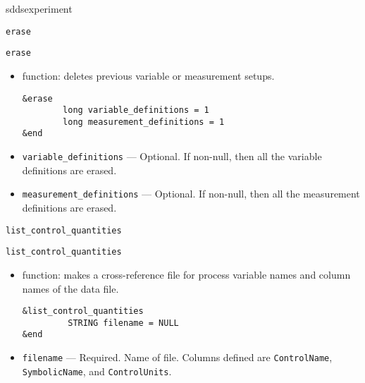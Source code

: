 \begin{sddsprog}{sddsexperiment}
\begin{itemize}
\begin{latexonly}
\newpage\begin{center}{\Large \verb+erase+}\end{center}
\end{latexonly}
\begin{htmlonly}
  \item {\Large \verb+erase+}
\end{htmlonly}
  \begin{itemize}
    \item function: deletes previous variable or measurement setups.
\begin{verbatim}
&erase
        long variable_definitions = 1
        long measurement_definitions = 1
&end
\end{verbatim}
    \item {\verb+variable_definitions+} --- Optional. If non-null, then all the variable definitions are erased.
    \item {\verb+measurement_definitions+} --- Optional. If non-null, then all the measurement definitions are erased.
  \end{itemize}

\begin{latexonly}
\begin{center}{\Large \verb+list_control_quantities+}\end{center}
\end{latexonly}
\begin{htmlonly}
  \item {\Large \verb+list_control_quantities+}
\end{htmlonly}
  \begin{itemize}
    \item function: makes a cross-reference file for process variable names and column names of the data file.
\begin{verbatim}
&list_control_quantities
         STRING filename = NULL
&end
\end{verbatim}
    \item {\verb+filename+} --- Required. Name of file. Columns defined are \verb+ControlName+,
               \verb+SymbolicName+, and \verb+ControlUnits+.
  \end{itemize}


\end{itemize}
\end{sddsprog}
